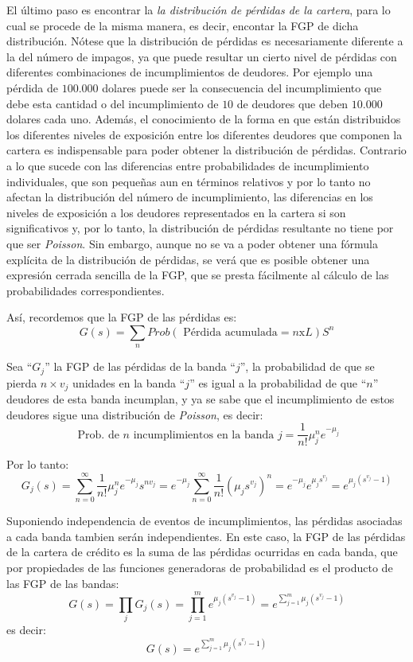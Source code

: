 \documentclass[
  12pt,
]{krantz}
\theoremstyle{definition}
\theoremstyle{definition}
\theoremstyle{definition}
\theoremstyle{remark}
\begin{document}
El último paso es encontrar la \emph{la distribución de pérdidas de la cartera}, para lo cual se procede de la misma manera, es decir, encontar la FGP de dicha distribución. Nótese que la distribución de pérdidas es necesariamente diferente a la del número de impagos, ya que puede resultar un cierto nivel de pérdidas con diferentes combinaciones de incumplimientos de deudores. Por ejemplo una pérdida de \(100.000\) dolares puede ser la consecuencia del incumplimiento que debe esta cantidad o del incumplimiento de \(10\) de deudores que deben \(10.000\) dolares cada uno. Además, el conocimiento de la forma en que están distribuidos los diferentes niveles de exposición entre los diferentes deudores que componen la cartera es indispensable para poder obtener la distribución de pérdidas. Contrario a lo que sucede con las diferencias entre probabilidades de incumplimiento individuales, que son pequeñas aun en términos relativos y por lo tanto no afectan la distribución del número de incumplimiento, las diferencias en los niveles de exposición a los deudores representados en la cartera si son significativos y, por lo tanto, la distribución de pérdidas resultante no tiene por que ser \emph{Poisson}. Sin embargo, aunque no se va a poder obtener una fórmula explícita de la distribución de pérdidas, se verá que es posible obtener una expresión cerrada sencilla de la FGP, que se presta fácilmente al cálculo de las probabilidades correspondientes.

Así, recordemos que la FGP de las pérdidas es: \[G(s)=\sum_nProb(\textrm{ Pérdida acumulada}=n\textrm{x}L)S^n\]

Sea ``\(G_j\)'' la FGP de las pérdidas de la banda ``\(j\)'', la probabilidad de que se pierda \(n\times v_j\) unidades en la banda ``\(j\)'' es igual a la probabilidad de que ``\(n\)'' deudores de esta banda incumplan, y ya se sabe que el incumplimiento de estos deudores sigue una distribución de \emph{Poisson}, es decir:\[\textrm{ Prob. de }n\textrm{ incumplimientos en la banda }j=\frac{1}{n!}\mu_j^ne^{-\mu_j}\]

Por lo tanto:\[G_j(s)=\sum_{n=0}^\infty \frac{1}{n!}\mu_j^ne^{-\mu_j}s^{nv_j}=e^{-\mu_j}\sum_{n=0}^\infty \frac{1}{n!}(\mu_js^{v_j})^n=e^{-\mu_j}e^{\mu_js^{v_j}}=e^{\mu_j(s^{v_j}-1)}\]

Suponiendo independencia de eventos de incumplimientos, las pérdidas asociadas a cada banda tambien serán independientes. En este caso, la FGP de las pérdidas de la cartera de crédito es la suma de las pérdidas ocurridas en cada banda, que por propiedades de las funciones generadoras de probabilidad es el producto de las FGP de las bandas:\[G(s)=\prod_jG_j(s)=\prod_{j=1}^me^{\mu_j(s^{v_j}-1)}=e^{\sum_{j=1}^m\mu_j(s^{v_j}-1)}\]es decir:\[G(s)=e^{\sum_{j=1}^m\mu_j(s^{v_j}-1)}\]
\end{document}
